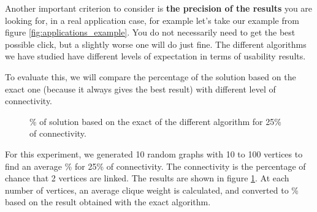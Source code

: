 Another important criterion to consider is \textbf{the precision of the results} you are looking for, in a real application case, for example let's take our example from figure \ref{fig:applications_example}. You do not necessarily need to get the best possible click, but a slightly worse one will do just fine. The different algorithms we have studied have different levels of expectation in terms of usability results. \bigskip

To evaluate this, we will compare the percentage of the solution based on the exact one (because it always gives the best result) with different level of connectivity. \bigskip

\begin{figure}[H]
    \centering
    \caption{\% of solution based on the exact of the different algorithm for 25\% of connectivity.}
    \label{fig:algorithm_25_accuracy}
\end{figure}


For this experiment, we generated 10 random graphs with 10 to 100 vertices to find an average \% for 25\% of connectivity. The connectivity is the percentage of chance that 2 vertices are linked. The results are shown in figure \ref{fig:algorithm_25_accuracy}. At each number of vertices, an average clique weight is calculated, and converted to \% based on the result obtained with the exact algorithm. \bigskip

